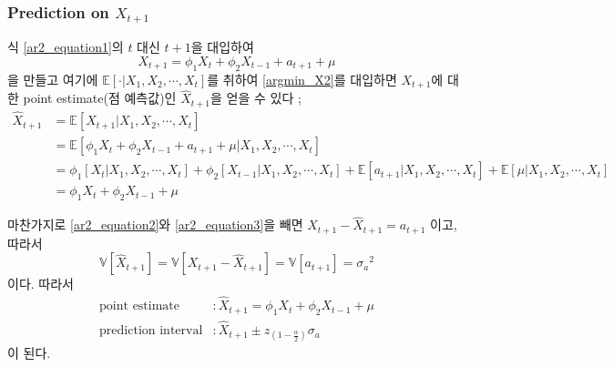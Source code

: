 \documentclass{article}
\newcommand\sa{\ensuremath{{\sigma_a}}}
\begin{document}
\subsubsection{Prediction on \(X_{t+1}\)}
식 \eqref{ar2_equation1}의 \(t\) 대신 \(t+1\)을 대입하여
\begin{equation}\label{ar2_equation2}
X_{t+1}=\phi_1X_t+\phi_2X_{t-1}+a_{t+1}+\mu
\end{equation}
을 만들고 여기에 \(\mathbb E[\cdot|X_1,X_2,\cdots,X_t]\)를 취하여 \eqref{argmin_X2}를 대입하면 \(X_{t+1}\)에 대한 point estimate(점 예측값)인 \(\hat X_{t+1}\)을 얻을 수 있다 ;
\begin{equation}\label{ar2_equation3}
\begin{aligned}
\hat X_{t+1}
&=\mathbb E\left[X_{t+1}|X_1,X_2,\cdots,X_t\right]\\
&=\mathbb E\left[\phi_1X_t+\phi_2X_{t-1}+a_{t+1}+\mu|X_1,X_2,\cdots,X_t\right]\\
&=\phi_1\left[X_t|X_1,X_2,\cdots,X_t\right]+\phi_2\left[X_{t-1}|X_1,X_2,\cdots,X_t\right]+\mathbb E\left[a_{t+1}|X_1,X_2,\cdots,X_t\right]+\mathbb E\left[\mu|X_1,X_2,\cdots,X_t\right]\\
&=\phi_1 X_t+\phi_2 X_{t-1}+\mu
\end{aligned}
\end{equation}

마찬가지로
\eqref{ar2_equation2}와 \eqref{ar2_equation3}을 빼면
\(X_{t+1}-\hat X_{t+1}=a_{t+1}\)
이고, 따라서
\[\mathbb V[\hat X_{t+1}]=\mathbb V[X_{t+1}-\hat X_{t+1}]=\mathbb V[a_{t+1}]=\sa^2\]
이다.
따라서
\begin{align*}
\text{point estimate}		&:\hat X_{t+1} = \phi_1X_t+\phi_2X_{t-1}+\mu\\
\text{prediction interval}	&:\hat X_{t+1}\pm z_{(1-\frac\alpha2)}\sa
\end{align*}
이 된다.

%
\end{document}
